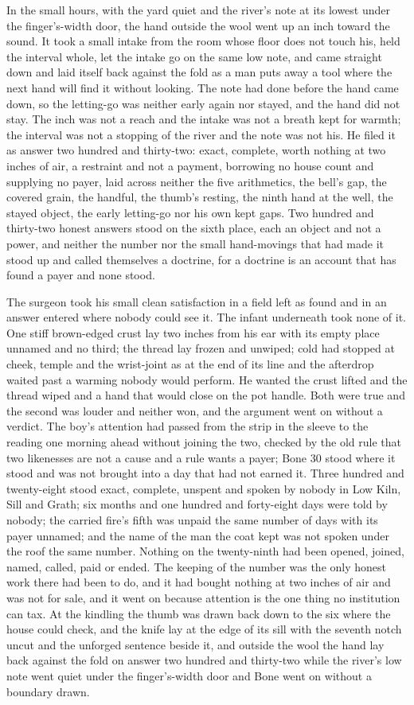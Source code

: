 In the small hours, with the yard quiet and the river's note at its lowest under the finger's-width door, the hand outside the wool went up an inch toward the sound. It took a small intake from the room whose floor does not touch his, held the interval whole, let the intake go on the same low note, and came straight down and laid itself back against the fold as a man puts away a tool where the next hand will find it without looking. The note had done before the hand came down, so the letting-go was neither early again nor stayed, and the hand did not stay. The inch was not a reach and the intake was not a breath kept for warmth; the interval was not a stopping of the river and the note was not his. He filed it as answer two hundred and thirty-two: exact, complete, worth nothing at two inches of air, a restraint and not a payment, borrowing no house count and supplying no payer, laid across neither the five arithmetics, the bell's gap, the covered grain, the handful, the thumb's resting, the ninth hand at the well, the stayed object, the early letting-go nor his own kept gaps. Two hundred and thirty-two honest answers stood on the sixth place, each an object and not a power, and neither the number nor the small hand-movings that had made it stood up and called themselves a doctrine, for a doctrine is an account that has found a payer and none stood.

The surgeon took his small clean satisfaction in a field left as found and in an answer entered where nobody could see it. The infant underneath took none of it. One stiff brown-edged crust lay two inches from his ear with its empty place unnamed and no third; the thread lay frozen and unwiped; cold had stopped at cheek, temple and the wrist-joint as at the end of its line and the afterdrop waited past a warming nobody would perform. He wanted the crust lifted and the thread wiped and a hand that would close on the pot handle. Both were true and the second was louder and neither won, and the argument went on without a verdict. The boy's attention had passed from the strip in the sleeve to the reading one morning ahead without joining the two, checked by the old rule that two likenesses are not a cause and a rule wants a payer; Bone 30 stood where it stood and was not brought into a day that had not earned it. Three hundred and twenty-eight stood exact, complete, unspent and spoken by nobody in Low Kiln, Sill and Grath; six months and one hundred and forty-eight days were told by nobody; the carried fire's fifth was unpaid the same number of days with its payer unnamed; and the name of the man the coat kept was not spoken under the roof the same number. Nothing on the twenty-ninth had been opened, joined, named, called, paid or ended. The keeping of the number was the only honest work there had been to do, and it had bought nothing at two inches of air and was not for sale, and it went on because attention is the one thing no institution can tax. At the kindling the thumb was drawn back down to the six where the house could check, and the knife lay at the edge of its sill with the seventh notch uncut and the unforged sentence beside it, and outside the wool the hand lay back against the fold on answer two hundred and thirty-two while the river's low note went quiet under the finger's-width door and Bone went on without a boundary drawn.
